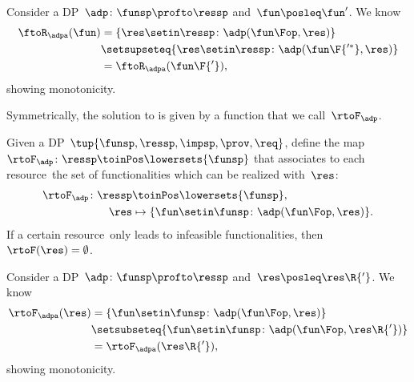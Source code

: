\begin{remark}[Monotonicity]
    Consider a DP~$\adp\colon\funsp\profto\ressp$ and~$\fun\posleq \fun'$.
    We know
    \begin{equation*}
        \begin{aligned}
            \ftoR_\adpa(\fun) & =\{ \res \setin \ressp \colon \adp(\fun\Fop, \res)\} \\
                              & \setsupseteq \{ \res \setin \ressp \colon \adp(\fun\F{'^*}, \res)\} \\
                              & =\ftoR_\adpa(\fun\F{'}),
        \end{aligned}
    \end{equation*}
    showing monotonicity.
\end{remark}

Symmetrically, the solution to \FixResMaxFun is given by a function that we call~$\rtoF_\adp$.

\begin{definition}
    \label{def:rtoF-dp}
    Given a DP~$\tup{ \funsp,\ressp,\impsp,\prov,\req}$, define the map~$\rtoF_{\adp}\colon \ressp\toinPos  \lowersets{\funsp}$ that associates to each resource~\res the set of functionalities which can be realized with~$\res$:
    \begin{equation*}
        \begin{aligned}
            \rtoF_{\adp}\colon \ressp & \toinPos \lowersets{\funsp}, \\
            \res                      & \mapsto \{ \fun \setin \funsp \colon \adp(\fun\Fop, \res)\}.
        \end{aligned}
    \end{equation*}
    If a certain resource~\res only leads to infeasible functionalities, then~$\rtoF(\res)=\emptyset$.
\end{definition}

\begin{remark}[Monotonicity]
    Consider a DP~$\adp\colon\funsp\profto\ressp$ and~$\res\posleq \res\R{'}$.
    We know
    \begin{equation*}
        \begin{aligned}
            \rtoF_\adpa(\res) & =\{ \fun \setin \funsp \colon \adp(\fun\Fop, \res)\} \\
                              & \setsubseteq \{ \fun \setin \funsp \colon \adp(\fun\Fop, \res\R{'})\} \\
                              & =\rtoF_\adpa(\res\R{'}),
        \end{aligned}
    \end{equation*}
    showing monotonicity.
\end{remark}

